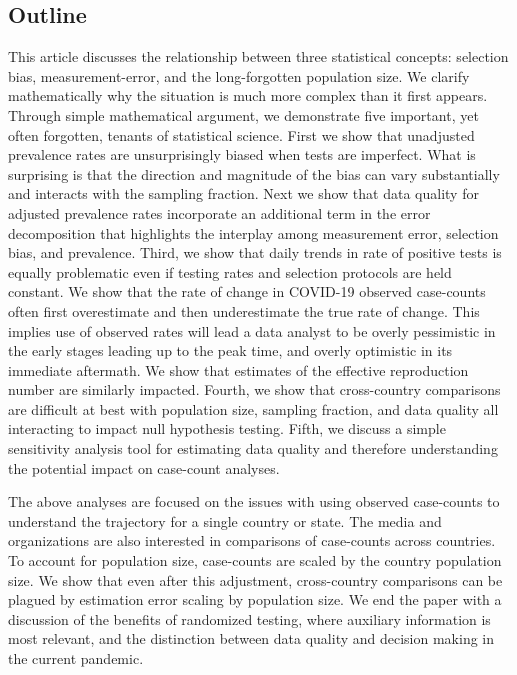 \documentclass[aoas]{amsart}
\begin{document}
\subsection{Outline}

This article discusses the relationship between three statistical concepts: selection bias, measurement-error, and the long-forgotten population size. We clarify mathematically why the situation is much more complex than it first appears.  Through simple mathematical argument, we demonstrate five important, yet often forgotten, tenants of statistical science.  First we show that unadjusted prevalence rates are unsurprisingly biased when tests are imperfect. What is surprising is that the direction and magnitude of the bias can vary substantially and interacts with the sampling fraction.  Next we show that data quality for adjusted prevalence rates incorporate an additional term in the error decomposition that highlights the interplay among measurement error, selection bias, and prevalence.  Third, we show that daily trends in rate of positive tests is equally problematic even if testing rates and selection protocols are held constant.  We show that the rate of change in COVID-19 observed case-counts often first overestimate and then underestimate the true rate of change. This implies use of observed rates will lead a data analyst to be overly pessimistic in the early stages leading up to the peak time, and overly optimistic in its immediate aftermath.  We show that estimates of the effective reproduction number are similarly impacted.  Fourth, we show that cross-country comparisons are difficult at best with population size, sampling fraction, and data quality all interacting to impact null hypothesis testing.  Fifth, we discuss a simple sensitivity analysis tool for estimating data quality and therefore understanding the potential impact on case-count analyses.

The above analyses are focused on the issues with using observed case-counts to understand the trajectory for a single country or state.  The media and organizations are also interested in comparisons of case-counts across countries. To account for population size, case-counts are scaled by the country population size.  We show that even after this adjustment, cross-country comparisons can be plagued by estimation error scaling by population size.  We end the paper with a discussion of the benefits of randomized testing, where auxiliary information is most relevant, and the distinction between data quality and decision making in the current pandemic.
\end{document}
